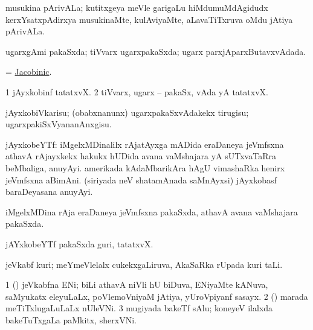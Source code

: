 \bentry
{}
\gl{\nA}
\bmng
musukina pArivALa; kutitxgeya meVle garigaLu hiMdumuMdAgidudx kerxYsatxpAdirxya musukinaMte, kulAviyaMte, aLavaTiTxruva oMdu jAtiya pArivALa. 
\emng
\eentry

\bentry
{}
\gl{\gu}
\bmng
ugarxgAmi pakaSxda; tiVvarx ugarxpakaSxda; ugarx parxjAparxButavxvAdada. 
\emng
\eentry

\bentry
{}
\gl{\gu}
\bmng
 = \hyperlink{Jacobinic}{Jacobinic}. 
\emng
\eentry

\bentry
{}
\gl{\nA}
\bmng
\bnum
\num{1} jAyxkobinf tatatxvX. 
\num{2} tiVvarx, ugarx -- pakaSx, vAda yA tatatxvX. 
\enum
\emng
\eentry

\bentry
{}
\gl{\sakirx}
\bmng
jAyxkobiVkarisu; (obabxnanunx) ugarxpakaSxvAdakekx tirugisu; ugarxpakiSxVyananAnxgisu. 
\emng
\eentry

\bentry
{}
\gl{\nA}
\bmng
jAyxkobeYTf: 
\banum
{} iMgelxMDinalilx rAjatAyxga mADida eraDaneya jeVmfsxna  athavA rAjayxkekx hakukx hUDida avana vaMshajara yA sUTxvaTaRra beMbaliga, anuyAyi. 
\hypertarget{Jacobite(2)}{} 
 amerikada kAdaMbarikAra hAgU vimashaRka henirx jeVmfsxna aBimAni. 
 (siriyada neV shatamAnada saMnAyxsi) jAyxkobasf baraDeyasana anuyAyi. 
\eanum
\emng
\eentry

\bentry
{}
\gl{\gu}
\bmng
iMgelxMDina rAja eraDaneya jeVmfsxna pakaSxda, athavA avana vaMshajara pakaSxda. 
\emng
\eentry

\bentry
{}
\gl{\nA}
\bmng
jAYxkobeYTf pakaSxda guri, tatatxvX. 
\emng
\eentry

\bentry
{}
\gl{\nA}
\bmng
jeVkabf kuri; meYmeVlelalx cukekxgaLiruva, AkaSaRka rUpada kuri taLi. 
\emng
\eentry

\bentry
{}
\gl{\nA}
\bmng
\bnum
\num{1} (\savi) jeVkabfna ENi; biLi athavA niVli hU biDuva, ENiyaMte kANuva, saMyukatx eleyuLaLx, poVlemoVniyaM jAtiya, yUroVpiyanf sasayx. 
\num{2} (\nw) marada meTiTxlugaLuLaLx nUleVNi.  
\num{3} mugiyada bakeTf sAlu; koneyeV ilalxda bakeTuTxgaLa paMkitx, sherxVNi. 
\enum
\emng
\eentry

